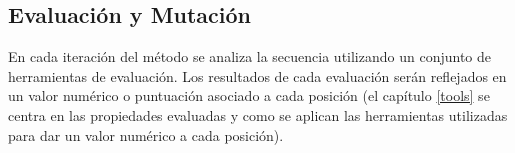 







\subsection{Evaluación y Mutación}\label{evalYmutacion}



En cada iteración del método se analiza la secuencia utilizando un conjunto de herramientas de evaluación.
Los resultados de cada evaluación serán reflejados en un valor numérico o puntuación asociado a cada posición
(el capítulo \ref{tools} se centra en las propiedades evaluadas y como se aplican las herramientas utilizadas para dar un valor numérico a cada posición). 

